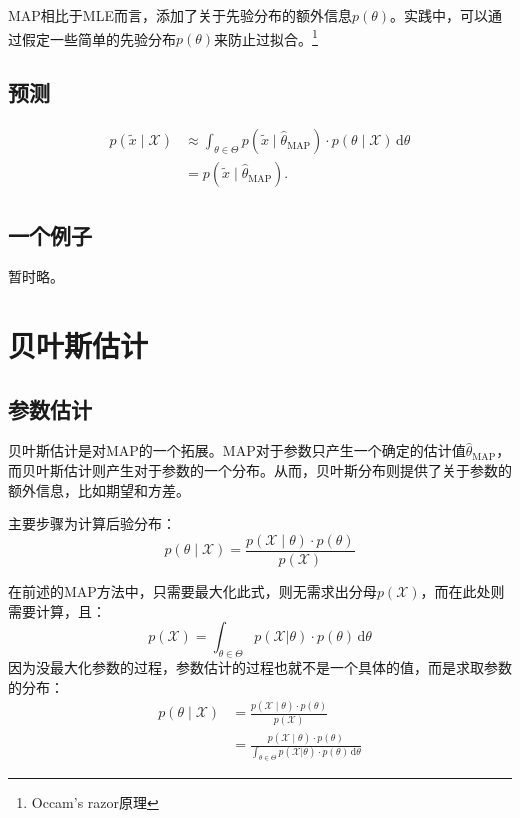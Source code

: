 \documentclass[utf8]{ctexart}
\begin{document}
MAP相比于MLE而言，添加了关于先验分布的额外信息$p(\theta)$。实践中，可以通过假定一些简单的先验分布$p(\theta)$来防止过拟合。\footnote{Occam's razor原理}

\subsection{预测}

\begin{align}
p(\tilde{x} \mid \mathcal{X}) 
	&\approx \int_{\theta \in \Theta} p(\tilde{x} \mid \hat{\theta}_{\text{MAP}}) \cdot p(\theta \mid \mathcal{X}) \, \text{d} \theta  \\
	&= p(\tilde{x} \mid \hat{\theta}_{\text{MAP}}).
\end{align}

\subsection{一个例子}
暂时略。

\section{贝叶斯估计}
\subsection{参数估计}
贝叶斯估计是对MAP的一个拓展。MAP对于参数只产生一个确定的估计值$\hat{\theta}_{\text{MAP}}$，而贝叶斯估计则产生对于参数的一个分布。从而，贝叶斯分布则提供了关于参数的额外信息，比如期望和方差。

主要步骤为计算后验分布：
\begin{equation}
	p(\theta \mid \mathcal{X}) = \frac{p(\mathcal{X} \mid \theta) \cdot p(\theta)}{p(\mathcal{X})}
\end{equation}

在前述的MAP方法中，只需要最大化此式，则无需求出分母$p(\mathcal{X})$，而在此处则需要计算，且：
\begin{equation}
	p(\mathcal{X}) = \int_{\theta \in \Theta} p( \mathcal{X} | \theta ) \cdot  p( \theta ) \, \text{d} \theta 
\end{equation}
因为没最大化参数的过程，参数估计的过程也就不是一个具体的值，而是求取参数的分布：
\begin{align}
	p(\theta \mid \mathcal{X}) &= \frac{p(\mathcal{X} \mid \theta) \cdot p(\theta)}{p(\mathcal{X})}	\\
	&=  \frac{p(\mathcal{X} \mid \theta) \cdot p(\theta)}{ \int_{\theta \in \Theta} p( \mathcal{X} | \theta ) \cdot  p( \theta ) \, \text{d} \theta }
\end{align}
\end{document}
